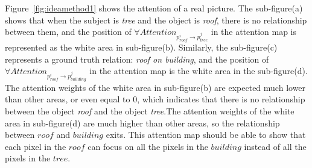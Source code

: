 Figure~\ref{fig:ideamethod1} shows the attention of a real picture. The sub-figure(a) shows that when the subject is \textit{tree} and the object is \textit{roof}, there is no relationship between them, and the position of $ \forall Attention_{p^i_{roof} \to p^j_{tree}}  $ in the attention map is represented as the white area in sub-figure(b). Similarly, the sub-figure(c) represents a ground truth relation: \textit{roof on building}, and the position of $ \forall Attention_{p^i_{roof} \to p^j_{building}}  $ in the attention map is the white area in the sub-figure(d). The attention weights of the white area in sub-figure(b) are expected much lower than other areas, or even equal to 0, which indicates that there is no relationship between the object \textit{roof} and the object \textit{tree}.The attention weights of the white area in sub-figure(d) are much higher than other areas, so the relationship between $ roof $ and $ building $ exits. This attention map should be able to show that each pixel in the $ roof $ can focus on all the pixels in the $ building $ instead of all the pixels in the $ tree $.




